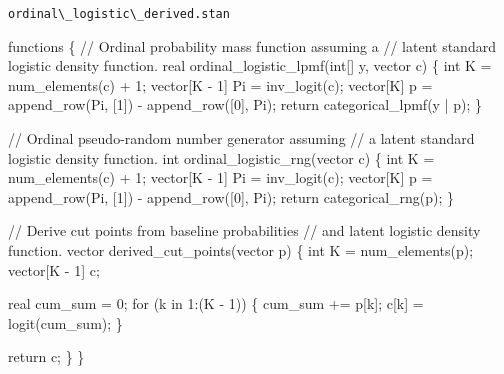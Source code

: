 \documentclass[
  letterpaper,
  DIV=11,
  numbers=noendperiod]{scrartcl}
\newenvironment{Shaded}{\begin{snugshade}}{\end{snugshade}}
\newcommand{\CommentTok}[1]{\textcolor[rgb]{0.37,0.37,0.37}{#1}}
\newcommand{\ControlFlowTok}[1]{\textcolor[rgb]{0.00,0.23,0.31}{#1}}
\newcommand{\DataTypeTok}[1]{\textcolor[rgb]{0.68,0.00,0.00}{#1}}
\newcommand{\DecValTok}[1]{\textcolor[rgb]{0.68,0.00,0.00}{#1}}
\newcommand{\KeywordTok}[1]{\textcolor[rgb]{0.00,0.23,0.31}{#1}}
\newcommand{\NormalTok}[1]{\textcolor[rgb]{0.00,0.23,0.31}{#1}}
\begin{document}
\begin{codelisting}

\caption{\texttt{ordinal\textbackslash\_logistic\textbackslash\_derived.stan}}

\begin{Shaded}
\begin{Highlighting}[]
\KeywordTok{functions}\NormalTok{ \{}
  \CommentTok{// Ordinal probability mass function assuming a}
  \CommentTok{// latent standard logistic density function.}
  \DataTypeTok{real}\NormalTok{ ordinal\_logistic\_lpmf(}\DataTypeTok{int}\NormalTok{[] y, }\DataTypeTok{vector}\NormalTok{ c) \{}
    \DataTypeTok{int}\NormalTok{ K = num\_elements(c) + }\DecValTok{1}\NormalTok{;}
    \DataTypeTok{vector}\NormalTok{[K {-} }\DecValTok{1}\NormalTok{] Pi = inv\_logit(c);}
    \DataTypeTok{vector}\NormalTok{[K] p = append\_row(Pi, [}\DecValTok{1}\NormalTok{]\textquotesingle{}) {-} append\_row([}\DecValTok{0}\NormalTok{]\textquotesingle{}, Pi);}
    \ControlFlowTok{return}\NormalTok{ categorical\_lpmf(y | p);}
\NormalTok{  \}}

  \CommentTok{// Ordinal pseudo{-}random number generator assuming}
  \CommentTok{// a latent standard logistic density function.}
  \DataTypeTok{int}\NormalTok{ ordinal\_logistic\_rng(}\DataTypeTok{vector}\NormalTok{ c) \{}
    \DataTypeTok{int}\NormalTok{ K = num\_elements(c) + }\DecValTok{1}\NormalTok{;}
    \DataTypeTok{vector}\NormalTok{[K {-} }\DecValTok{1}\NormalTok{] Pi = inv\_logit(c);}
    \DataTypeTok{vector}\NormalTok{[K] p = append\_row(Pi, [}\DecValTok{1}\NormalTok{]\textquotesingle{}) {-} append\_row([}\DecValTok{0}\NormalTok{]\textquotesingle{}, Pi);}
    \ControlFlowTok{return}\NormalTok{ categorical\_rng(p);}
\NormalTok{  \}}

  \CommentTok{// Derive cut points from baseline probabilities}
  \CommentTok{// and latent logistic density function.}
  \DataTypeTok{vector}\NormalTok{ derived\_cut\_points(}\DataTypeTok{vector}\NormalTok{ p) \{}
    \DataTypeTok{int}\NormalTok{ K = num\_elements(p);}
    \DataTypeTok{vector}\NormalTok{[K {-} }\DecValTok{1}\NormalTok{] c;}

    \DataTypeTok{real}\NormalTok{ cum\_sum = }\DecValTok{0}\NormalTok{;}
    \ControlFlowTok{for}\NormalTok{ (k }\ControlFlowTok{in} \DecValTok{1}\NormalTok{:(K {-} }\DecValTok{1}\NormalTok{)) \{}
\NormalTok{      cum\_sum += p[k];}
\NormalTok{      c[k] = logit(cum\_sum);}
\NormalTok{    \}}

    \ControlFlowTok{return}\NormalTok{ c;}
\NormalTok{  \}}
\NormalTok{\}}


\end{Highlighting}
\end{Shaded}
\end{codelisting}
\end{document}
